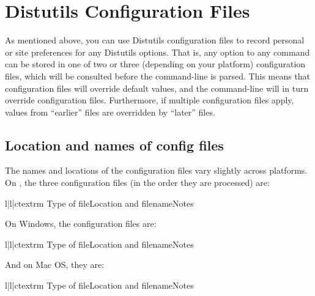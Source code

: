 \documentclass{howto}
\begin{document}


\section{Distutils Configuration Files}
\label{config-files}

As mentioned above, you can use Distutils configuration files to record
personal or site preferences for any Distutils options.  That is, any
option to any command can be stored in one of two or three (depending on
your platform) configuration files, which will be consulted before the
command-line is parsed.  This means that configuration files will
override default values, and the command-line will in turn override
configuration files.  Furthermore, if multiple configuration files
apply, values from ``earlier'' files are overridden by ``later'' files.


\subsection{Location and names of config files}
\label{config-filenames}

The names and locations of the configuration files vary slightly across
platforms.  On \UNIX, the three configuration files (in the order they
are processed) are:
\begin{tableiii}{l|l|c}{textrm}
  {Type of file}{Location and filename}{Notes}
\end{tableiii}

On Windows, the configuration files are:
\begin{tableiii}{l|l|c}{textrm}
  {Type of file}{Location and filename}{Notes}
\end{tableiii}

And on Mac OS, they are:
\begin{tableiii}{l|l|c}{textrm}
  {Type of file}{Location and filename}{Notes}
\end{tableiii}
\end{document}
